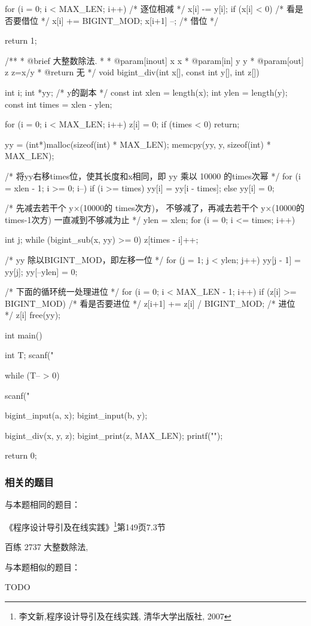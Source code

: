 \begin{Codex}[label=bigint_div.c]
{    for (i = 0; i < MAX_LEN; i++) {  /* 逐位相减 */
        x[i] -= y[i];
        if (x[i] < 0) {  /* 看是否要借位 */
            x[i] += BIGINT_MOD;
            x[i+1] --;  /* 借位 */
        }
    }

    return 1;
}

/**
 * @brief 大整数除法.
 *
 * @param[inout] x x
 * @param[in] y y
 * @param[out] z z=x/y
 * @return 无
 */
void bigint_div(int x[], const int y[], int z[]) {
    int i;
    int *yy; /* y的副本 */
    const int xlen = length(x);
    int ylen = length(y);
    const int times = xlen - ylen;

    for (i = 0; i < MAX_LEN; i++) z[i] = 0;
    if (times < 0) return;

    yy = (int*)malloc(sizeof(int) * MAX_LEN);
    memcpy(yy, y, sizeof(int) * MAX_LEN);


    /* 将yy右移times位，使其长度和x相同，即 yy 乘以 10000 的times次幂 */
    for (i = xlen - 1; i >= 0; i--) {
        if (i >= times) yy[i] = yy[i - times];
        else yy[i] = 0;
    }

    /* 先减去若干个 y×(10000的 times次方)， 
      不够减了，再减去若干个 y×(10000的 times-1次方)
      一直减到不够减为止 */
    ylen = xlen;
    for (i = 0; i <= times; i++) {
        int j;
        while (bigint_sub(x, yy) >= 0) {
            z[times - i]++;
        }

        /* yy 除以BIGINT_MOD，即左移一位 */
        for (j = 1; j < ylen; j++) {
            yy[j - 1] = yy[j];
        }
        yy[--ylen] = 0;
    }

    /* 下面的循环统一处理进位 */
    for (i = 0; i < MAX_LEN - 1; i++) {
        if (z[i] >= BIGINT_MOD) {  /* 看是否要进位 */
            z[i+1] += z[i] / BIGINT_MOD;  /* 进位 */
            z[i] %
        }
    }
    free(yy);
}

int main() {
    int T;    
    scanf("%

    while (T-- > 0) {
        scanf("%

        bigint_input(a, x);
        bigint_input(b, y);

        bigint_div(x, y, z);
        bigint_print(z, MAX_LEN);
        printf("\n"); 
    }
    return 0;
}
\end{Codex}

\subsubsection{相关的题目}
与本题相同的题目：
\begindot
\item 《程序设计导引及在线实践》\footnote{李文新,程序设计导引及在线实践, 清华大学出版社, 2007}第149页7.3节
\item 百练 2737 大整数除法, 
\myenddot

与本题相似的题目：
\begindot
\item  TODO
\myenddot

